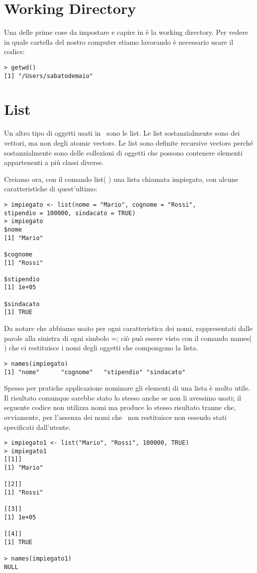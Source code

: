 \section{Working Directory}

Una delle prime cose da impostare e capire in \erre è la working directory. Per vedere in quale cartella del nostro computer stiamo lavorando è necessario usare il codice:
\begin{lstlisting}
> getwd()
[1] "/Users/sabatodemaio"
\end{lstlisting}


\section{List}
Un altro tipo di oggetti usati in \erre\ sono le list. Le list sostanzialmente sono dei vettori, ma non degli atomic vectors. Le list sono definite recursive vectors perché sostanzialmente sono delle collezioni di oggetti che possono contenere elementi appartenenti a più classi diverse.

Creiamo ora, con il comando \textsf{list( )} una lista chiamata impiegato, con alcune caratteristiche di quest'ultimo:

\begin{lstlisting}
> impiegato <- list(nome = "Mario", cognome = "Rossi", 
stipendio = 100000, sindacato = TRUE)
> impiegato
$nome
[1] "Mario"

$cognome
[1] "Rossi"

$stipendio
[1] 1e+05

$sindacato
[1] TRUE
\end{lstlisting}

Da notare che abbiamo usato per ogni caratteristica dei nomi, rappresentati dalle parole alla sinistra di ogni simbolo =; ciò può essere visto con il comando \textsf{names( )} che ci restituisce i nomi degli oggetti che compongono la lista.
\begin{lstlisting}
> names(impiegato)
[1] "nome"      "cognome"   "stipendio" "sindacato"
\end{lstlisting}

Spesso per pratiche applicazione nominare gli elementi di una lista è molto utile. Il risultato comunque sarebbe stato lo stesso anche se non li avessimo usati; il seguente codice non utilizza nomi ma produce lo stesso risultato tranne che, ovviamente, per l'assenza dei nomi che \erre\ non restituisce non essendo stati specificati dall'utente.
\begin{lstlisting}
> impiegato1 <- list("Mario", "Rossi", 100000, TRUE)
> impiegato1
[[1]]
[1] "Mario"

[[2]]
[1] "Rossi"

[[3]]
[1] 1e+05

[[4]]
[1] TRUE

> names(impiegato1)
NULL
\end{lstlisting}

